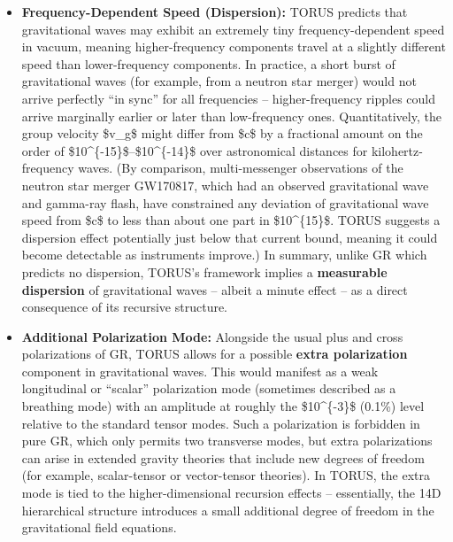 \documentclass[
]{article}
\begin{document}
\begin{itemize}
\item
  \textbf{Frequency-Dependent Speed (Dispersion):} TORUS predicts that
  gravitational waves may exhibit an extremely tiny frequency-dependent
  speed in vacuum, meaning higher-frequency components travel at a
  slightly different speed than lower-frequency components\hspace{0pt}.
  In practice, a short burst of gravitational waves (for example, from a
  neutron star merger) would not arrive perfectly ``in sync'' for all
  frequencies -- higher-frequency ripples could arrive marginally
  earlier or later than low-frequency ones. Quantitatively, the group
  velocity \$v\_g\$ might differ from \$c\$ by a fractional amount on
  the order of \$10\^{}\{-15\}\$--\$10\^{}\{-14\}\$ over astronomical
  distances for kilohertz-frequency waves\hspace{0pt}. (By comparison,
  multi-messenger observations of the neutron star merger GW170817,
  which had an observed gravitational wave and gamma-ray flash, have
  constrained any deviation of gravitational wave speed from \$c\$ to
  less than about one part in \$10\^{}\{15\}\$\hspace{0pt}. TORUS
  suggests a dispersion effect potentially just below that current
  bound, meaning it could become detectable as instruments improve.) In
  summary, unlike GR which predicts no dispersion, TORUS's framework
  implies a \textbf{measurable dispersion} of gravitational waves --
  albeit a minute effect -- as a direct consequence of its recursive
  structure.
\item
  \textbf{Additional Polarization Mode:} Alongside the usual plus and
  cross polarizations of GR, TORUS allows for a possible \textbf{extra
  polarization} component in gravitational waves\hspace{0pt}. This would
  manifest as a weak longitudinal or ``scalar'' polarization mode
  (sometimes described as a breathing mode) with an amplitude at roughly
  the \$10\^{}\{-3\}\$ (0.1\%) level relative to the standard tensor
  modes\hspace{0pt}. Such a polarization is forbidden in pure GR, which
  only permits two transverse modes, but extra polarizations can arise
  in extended gravity theories that include new degrees of freedom (for
  example, scalar-tensor or vector-tensor theories). In TORUS, the extra
  mode is tied to the higher-dimensional recursion effects --
  essentially, the 14D hierarchical structure introduces a small
  additional degree of freedom in the gravitational field equations.

\end{itemize}
\end{document}
